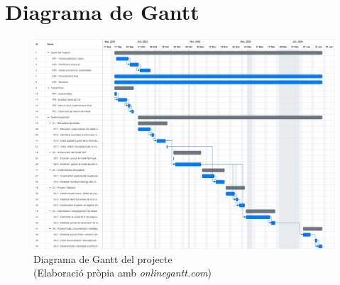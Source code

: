 \section{Diagrama de Gantt}
\begin{figure}[H]
    \centering
    \includegraphics[width=\linewidth, keepaspectratio]{gantt.png}
    \caption[Diagrama de Gantt]{Diagrama de Gantt del projecte \\ (Elaboració pròpia amb \textit{onlinegantt.com})}
    \label{fig:gantt}
\end{figure}
